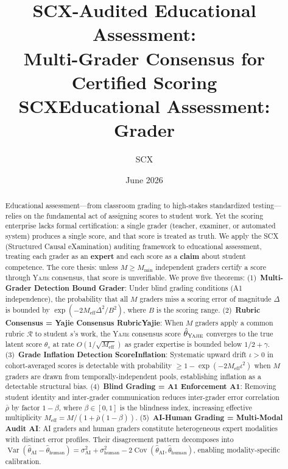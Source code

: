 \documentclass[11pt,a4paper]{article}
\title{\textbf{SCX-Audited Educational Assessment:}\\[4pt]
       \large Multi-Grader Consensus for Certified Scoring\\[4pt]
       \normalsize \textbf{SCXEducational Assessment: Grader}}
\author{SCX}
\date{June 2026}
\theoremstyle{definition}
\theoremstyle{remark}
\newcommand{\SCX}{\textsc{SCX}}
\newcommand{\Yajie}{\textsc{Yajie}}
\DeclareMathOperator{\Var}{Var}
\DeclareMathOperator{\Cov}{Cov}
\newcommand{\cR}{\mathcal{R}}
\newcommand{\rubric}{\cR}
\newcommand{\trueScore}{\theta}
\newcommand{\inflationRate}{\iota}
\begin{document}
\maketitle
\begin{abstract}
\noindent
Educational assessment---from classroom grading to high-stakes standardized testing---relies on the fundamental act of assigning scores to student work. Yet the scoring enterprise lacks formal certification: a single grader (teacher, examiner, or automated system) produces a single score, and that score is treated as truth. We apply the \SCX{} (Structured Causal eXamination) auditing framework to educational assessment, treating each grader as an \textbf{expert} and each score as a \textbf{claim} about student competence. The core thesis: unless $M \ge M_{\min}$ independent graders certify a score through \Yajie{} consensus, that score is unverifiable. We prove five theorems:
(1)~\textbf{Multi-Grader Detection Bound Grader}: Under blind grading conditions (A1 independence), the probability that all $M$ graders miss a scoring error of magnitude $\Delta$ is bounded by $\exp(-2M_{\text{eff}}\Delta^2 / B^2)$, where $B$ is the scoring range.
(2)~\textbf{Rubric Consensus = Yajie Consensus RubricYajie}: When $M$ graders apply a common rubric $\rubric$ to student $s$'s work, the \Yajie{} consensus score $\hat{\theta}_{\Yajie}$ converges to the true latent score $\trueScore_s$ at rate $O(1/\sqrt{M_{\text{eff}}})$ as grader expertise is bounded below $1/2 + \gamma$.
(3)~\textbf{Grade Inflation Detection ScoreInflation}: Systematic upward drift $\inflationRate > 0$ in cohort-averaged scores is detectable with probability $\ge 1 - \exp(-2M_{\text{eff}}\inflationRate^2)$ when $M$ graders are drawn from temporally-independent pools, establishing inflation as a detectable structural bias.
(4)~\textbf{Blind Grading = A1 Enforcement A1}: Removing student identity and inter-grader communication reduces inter-grader error correlation $\bar{\rho}$ by factor $1 - \beta$, where $\beta \in [0,1]$ is the blindness index, increasing effective multiplicity $M_{\text{eff}} = M/(1 + \bar{\rho}(1-\beta))$.
(5)~\textbf{AI-Human Grading = Multi-Modal Audit AI}: AI graders and human graders constitute heterogeneous expert modalities with distinct error profiles. Their disagreement pattern decomposes into $\Var(\hat{\theta}_{\text{AI}} - \hat{\theta}_{\text{human}}) = \sigma_{\text{AI}}^2 + \sigma_{\text{human}}^2 - 2\Cov(\hat{\theta}_{\text{AI}}, \hat{\theta}_{\text{human}})$, enabling modality-specific calibration.

\end{abstract}
\end{document}
